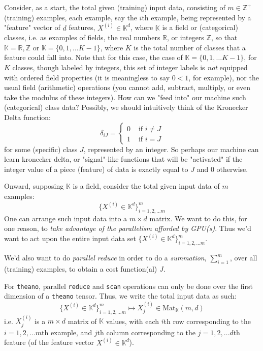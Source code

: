 \documentclass[10pt]{amsart}
\begin{document}
\begin{multicols*}{2}
Consider, as a start, the total given (training) input data, consisting of $m\in \mathbb{Z}^+$ (training) examples, each example, say the $i$th example, being represented by a "feature" vector of $d$ features, $X^{(i)} \in \mathbb{K}^d$, where $\mathbb{K}$ is a field or (categorical) classes, i.e. as examples of fields, the real numbers $\mathbb{R}$, or integers $\mathbb{Z}$, so that $\mathbb{K} = \mathbb{R},\mathbb{Z}$ or $\mathbb{K} = \lbrace 0 ,1,\dots K-1\rbrace$, where $K$ is the total number of classes that a feature could fall into.  Note that for this case, the case of $\mathbb{K}=\lbrace 0 ,1,\dots K-1\rbrace$, for $K$ classes, though labeled by integers, this set of integer labels is \emph{not} equipped with ordered field properties (it is meaningless to say $0<1$, for example), nor the usual field (arithmetic) operations (you cannot add, subtract, multiply, or even take the modulus of these integers).  How can we "feed into" our machine such (categorical) class data?  Possibly, we should intuitively think of the Kronecker Delta function:
\[
\delta_{iJ} = \begin{cases} 0 & \text{ if } i\neq J \\ 
 1 & \text{ if } i = J \end{cases}
\]
for some (specific) class $J$, represented by an integer.  So perhaps our machine can learn kronecker delta, or "signal"-like functions that will be "activated" if the integer value of a piece (feature) of data is exactly equal to $J$ and $0$ otherwise.  

Onward, supposing $\mathbb{K}$ is a field, consider the total given input data of $m$ examples:
\[
\lbrace X^{(i)} \in \mathbb{K}^d\rbrace^m_{i=1,2,\dots m}
\]
One can arrange such input data into a $m\times d$ matrix.  We want to do this, for one reason, to \emph{take advantage of the parallelism afforded by GPU(s)}.  Thus we'd want to act upon the entire input data set $\lbrace X^{(i)} \in \mathbb{K}^d\rbrace^m_{i=1,2,\dots m}$.  

We'd also want to do \emph{parallel reduce} in order to do a \emph{summation}, $\sum_{i=1}^m$, over all (training) examples, to obtain a cost function(al) $J$.  

For \verb|theano|, parallel \verb|reduce| and \verb|scan| operations can only be done over the first dimension of a \verb|theano| tensor.  Thus, we write the total input data as such:
\begin{equation}
\lbrace X^{(i)} \in \mathbb{K}^d\rbrace^m_{i=1,2,\dots m} \mapsto X^{(i)}_j \in \text{Mat}_{\mathbb{K}}(m,d)
\end{equation}
i.e. $X^{(i)}_j$ is a $m\times d$ matrix of $\mathbb{K}$ values, with each $i$th row corresponding to the $i=1,2,\dots m$th example,  and $j$th column corresponding to the $j=1,2,\dots d$th feature (of the feature vector $X^{(i)} \in \mathbb{K}^d$).  


\end{multicols*}
\end{document}

